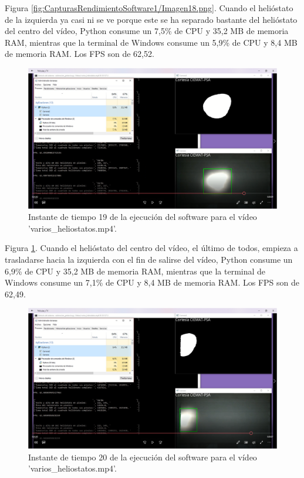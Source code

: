 Figura \ref{fig:CapturasRendimientoSoftware1/Imagen18.png}. Cuando el helióstato de la izquierda ya casi ni se ve porque este se ha separado bastante del helióstato del centro del vídeo, Python consume un 7,5\% de CPU y 35,2 MB de memoria RAM, mientras que la terminal de Windows consume un 5,9\% de CPU y 8,4 MB de memoria RAM. Los FPS son de 62,52.

\begin{figure}[h!]
  	\centering
	\includegraphics[width=\textwidth]{CapturasRendimientoSoftware1/Imagen19.png}
	\caption{Instante de tiempo 19 de la ejecución del software para el vídeo 'varios\_heliostatos.mp4'.
	\label{fig:CapturasRendimientoSoftware1/Imagen19.png}}
\end{figure}

Figura \ref{fig:CapturasRendimientoSoftware1/Imagen19.png}. Cuando el helióstato del centro del vídeo, el último de todos, empieza a trasladarse hacia la izquierda con el fin de salirse del vídeo, Python consume un 6,9\% de CPU y 35,2 MB de memoria RAM, mientras que la terminal de Windows consume un 7,1\% de CPU y 8,4 MB de memoria RAM. Los FPS son de 62,49.

\begin{figure}[h!]
  	\centering
	\includegraphics[width=\textwidth]{CapturasRendimientoSoftware1/Imagen20.png}
	\caption{Instante de tiempo 20 de la ejecución del software para el vídeo 'varios\_heliostatos.mp4'.
	\label{fig:CapturasRendimientoSoftware1/Imagen20.png}}
\end{figure}

